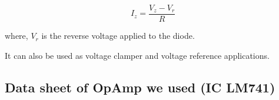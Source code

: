 \documentclass[14pt,a4paper]{extarticle}
\begin{document}
$$I_z = \frac{V_z - V_r}{R}$$

where, \(V_r\) is the reverse voltage applied to the diode.

It can also be used as voltage clamper and voltage reference applications.

\subsection{Data sheet of OpAmp we used (IC LM741)}
\label{sec:orgb94068b}
\begin{figure}[H] 
\end{figure}  
\pagebreak
\end{document}
